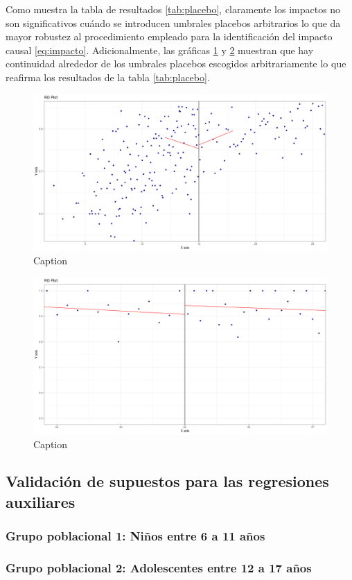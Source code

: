 \documentclass[AER]{AEA}
\begin{document}
Como muestra la tabla de resultados \ref{tab:placebo}, claramente los impactos no son significativos cuándo se introducen umbrales placebos arbitrarios lo que da mayor robustez al procedimiento empleado para la identificación del impacto causal \ref{eq:impacto}. Adicionalmente, las gráficas \ref{fig:placebo1} y \ref{fig:placebo2} muestran que hay continuidad alrededor de los umbrales placebos escogidos arbitrariamente lo que reafirma los resultados de la tabla \ref{tab:placebo}.

\begin{figure}
    \centering
    \includegraphics[scale = 0.35]{imagenes/estimax_principal/placebo1_main.png}
    \caption{Caption}
    \label{fig:placebo1}
\end{figure}

\begin{figure}
    \centering
    \includegraphics[scale = 0.35]{imagenes/estimax_principal/placebo2_main.png}
    \caption{Caption}
    \label{fig:placebo2}
\end{figure}

\subsection{Validación de supuestos para las regresiones auxiliares}

\subsubsection{Grupo poblacional 1: Niños entre 6 a 11 años}



\subsubsection{Grupo poblacional 2: Adolescentes entre 12 a 17 años}



\newpage


\end{document}
